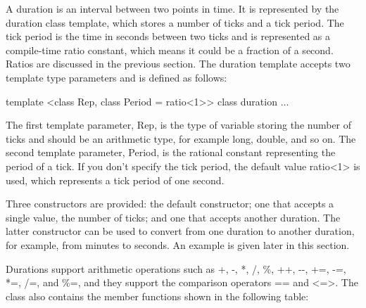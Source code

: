 
A duration is an interval between two points in time. It is represented by the duration class template, which stores a number of ticks and a tick period. The tick period is the time in seconds between two ticks and is represented as a compile-time ratio constant, which means it could be a fraction of a second. Ratios are discussed in the previous section. The duration template accepts two template type parameters and is defined as follows:

\begin{cpp}
template <class Rep, class Period = ratio<1>> class duration {...}
\end{cpp}

The first template parameter, Rep, is the type of variable storing the number of ticks and should be an arithmetic type, for example long, double, and so on. The second template parameter, Period, is the rational constant representing the period of a tick. If you don’t specify the tick period, the default value ratio<1> is used, which represents a tick period of one second.

Three constructors are provided: the default constructor; one that accepts a single value, the number of ticks; and one that accepts another duration. The latter constructor can be used to convert from one duration to another duration, for example, from minutes to seconds. An example is given later in this section.

Durations support arithmetic operations such as +, -, *, /, \%, ++, -{}-, +=, -=, *=, /=, and \%=, and they support the comparison operators == and <=>. The class also contains the member functions shown in the following table:


